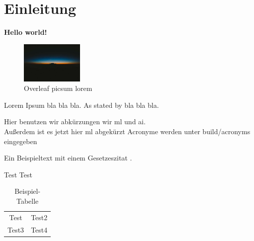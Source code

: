 \documentclass[../main.tex]{subfiles}
\begin{document}
\section{Einleitung}

\textbf{Hello world!} %

\begin{figure}[h]
    \centering
    \includegraphics[width=3cm]{images/picsum lorem.jpg} %
    \caption{Overleaf picsum lorem} %
    \label{fig:picsum_lorem} %
\end{figure}

Lorem Ipsum bla\autocite[10]{smith2018} bla bla. As stated by bla bla bla. %

Hier benutzen wir abkürzungen wir \gls{ml} und \gls{ai}.\\ %
Außerdem ist es jetzt hier \gls{ml} abgekürzt
Acronyme werden unter build/acronyms eingegeben

Ein Beispieltext mit einem Gesetzeszitat . %

Test Test \autocite[15-27]{johnson2020} %

\medskip

\begin{table}[h]
    \centering
    \begin{tabular}{cc}
        Test & Test2\\
        Test3 & Test4\\
    \end{tabular}
    \caption{Beispiel-Tabelle} %
    \label{tab:example_table} %
\end{table}
\end{document}
